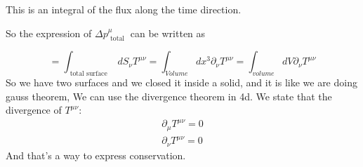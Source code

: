 \begin{minipage}[t]{0.48\textwidth}
    \vspace*{0pt} 
    This is an integral of the flux along the time direction. \par
    So the expression of $\Delta p^{\mu }_{ \text{ total }}$ can be written as \par
\end{minipage}

\[
= \int_{ \text{ total surface }}^{}{dS_{\nu }T^{\mu \nu }} = \int_{Volume}^{}{dx^{3}\partial_{\nu }T^{\mu \nu }} = \int_{volume}^{}{dV \partial_{\nu }T^{\mu \nu }}
\]
So we have two surfaces and we closed it inside a solid, and it is like we are doing gauss theorem, We can use the divergence theorem in 4d. We state that the divergence of $T^{\mu \nu }$:
\begin{gather*}
\partial_{\mu }T^{\mu \nu } = 0 \\
\partial_{\nu }T^{\mu \nu } = 0
\end{gather*}
And that's a way to express conservation.


